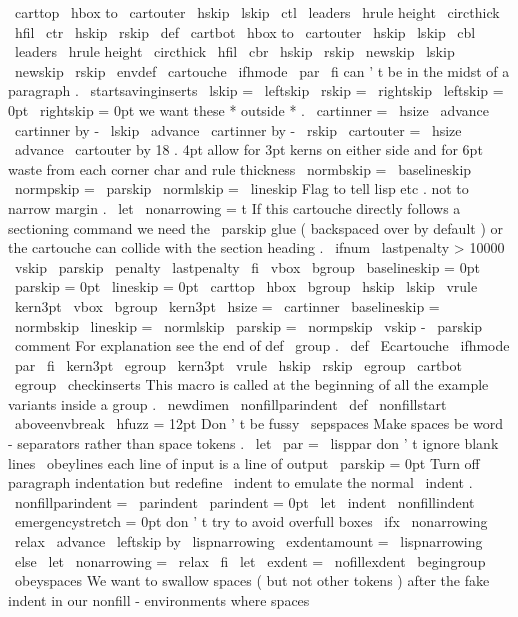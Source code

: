{{{{\
carttop
{
\
hbox
to
\
cartouter
{
\
hskip
\
lskip
\
ctl
\
leaders
\
hrule
height
\
circthick
\
hfil
\
ctr
\
hskip
\
rskip
}
}
\
def
\
cartbot
{
\
hbox
to
\
cartouter
{
\
hskip
\
lskip
\
cbl
\
leaders
\
hrule
height
\
circthick
\
hfil
\
cbr
\
hskip
\
rskip
}
}
%
\
newskip
\
lskip
\
newskip
\
rskip
\
envdef
\
cartouche
{
%
\
ifhmode
\
par
\
fi
%
can
'
t
be
in
the
midst
of
a
paragraph
.
\
startsavinginserts
\
lskip
=
\
leftskip
\
rskip
=
\
rightskip
\
leftskip
=
0pt
\
rightskip
=
0pt
%
we
want
these
*
outside
*
.
\
cartinner
=
\
hsize
\
advance
\
cartinner
by
-
\
lskip
\
advance
\
cartinner
by
-
\
rskip
\
cartouter
=
\
hsize
\
advance
\
cartouter
by
18
.
4pt
%
allow
for
3pt
kerns
on
either
%
side
and
for
6pt
waste
from
%
each
corner
char
and
rule
thickness
\
normbskip
=
\
baselineskip
\
normpskip
=
\
parskip
\
normlskip
=
\
lineskip
%
Flag
to
tell
lisp
etc
.
not
to
narrow
margin
.
\
let
\
nonarrowing
=
t
%
%
%
If
this
cartouche
directly
follows
a
sectioning
command
we
need
the
%
\
parskip
glue
(
backspaced
over
by
default
)
or
the
cartouche
can
%
collide
with
the
section
heading
.
\
ifnum
\
lastpenalty
>
10000
\
vskip
\
parskip
\
penalty
\
lastpenalty
\
fi
%
\
vbox
\
bgroup
\
baselineskip
=
0pt
\
parskip
=
0pt
\
lineskip
=
0pt
\
carttop
\
hbox
\
bgroup
\
hskip
\
lskip
\
vrule
\
kern3pt
\
vbox
\
bgroup
\
kern3pt
\
hsize
=
\
cartinner
\
baselineskip
=
\
normbskip
\
lineskip
=
\
normlskip
\
parskip
=
\
normpskip
\
vskip
-
\
parskip
\
comment
%
For
explanation
see
the
end
of
def
\
group
.
}
\
def
\
Ecartouche
{
%
\
ifhmode
\
par
\
fi
\
kern3pt
\
egroup
\
kern3pt
\
vrule
\
hskip
\
rskip
\
egroup
\
cartbot
\
egroup
\
checkinserts
}
%
This
macro
is
called
at
the
beginning
of
all
the
example
variants
%
inside
a
group
.
\
newdimen
\
nonfillparindent
\
def
\
nonfillstart
{
%
\
aboveenvbreak
\
hfuzz
=
12pt
%
Don
'
t
be
fussy
\
sepspaces
%
Make
spaces
be
word
-
separators
rather
than
space
tokens
.
\
let
\
par
=
\
lisppar
%
don
'
t
ignore
blank
lines
\
obeylines
%
each
line
of
input
is
a
line
of
output
\
parskip
=
0pt
%
Turn
off
paragraph
indentation
but
redefine
\
indent
to
emulate
%
the
normal
\
indent
.
\
nonfillparindent
=
\
parindent
\
parindent
=
0pt
\
let
\
indent
\
nonfillindent
%
\
emergencystretch
=
0pt
%
don
'
t
try
to
avoid
overfull
boxes
\
ifx
\
nonarrowing
\
relax
\
advance
\
leftskip
by
\
lispnarrowing
\
exdentamount
=
\
lispnarrowing
\
else
\
let
\
nonarrowing
=
\
relax
\
fi
\
let
\
exdent
=
\
nofillexdent
}
\
begingroup
\
obeyspaces
%
We
want
to
swallow
spaces
(
but
not
other
tokens
)
after
the
fake
%
indent
in
our
nonfill
-
environments
where
spaces
}}}}
